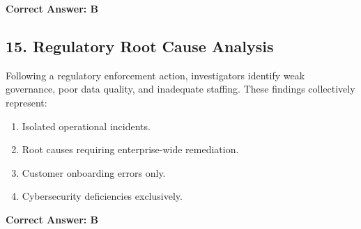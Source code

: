 \documentclass[11pt,a4paper]{article}
\begin{document}
	\textbf{Correct Answer: B}
	
	\subsection{15. Regulatory Root Cause Analysis}
	
	Following a regulatory enforcement action, investigators identify weak governance, poor data quality, and inadequate staffing. These findings collectively represent:
	
	\begin{enumerate}[label=\Alph*.]
		\item Isolated operational incidents.
		\item Root causes requiring enterprise-wide remediation.
		\item Customer onboarding errors only.
		\item Cybersecurity deficiencies exclusively.
	\end{enumerate}
	
	\textbf{Correct Answer: B}
\end{document}
